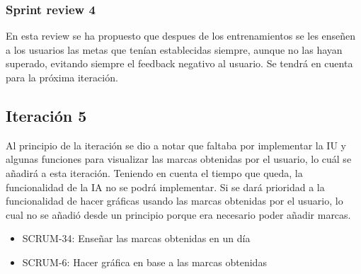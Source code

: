 \subsubsection{Sprint review 4}

En esta review se ha propuesto que despues de los entrenamientos se les enseñen a los usuarios las metas que tenían establecidas siempre, aunque no las hayan superado, evitando siempre el feedback negativo al usuario. Se tendrá en cuenta para la próxima iteración.

\subsection{Iteración 5}

Al principio de la iteración se dio a notar que faltaba por implementar la IU y algunas funciones para visualizar las marcas obtenidas por el usuario, lo cuál se añadirá a esta iteración. Teniendo en cuenta el tiempo que queda, la funcionalidad de la IA no se podrá implementar. Si se dará prioridad a la funcionalidad de hacer gráficas usando las marcas obtenidas por el usuario, lo cual no se añadió desde un principio porque era necesario poder añadir marcas.

\begin{itemize}
	\item SCRUM-34: Enseñar las marcas obtenidas en un día
	\item SCRUM-6: Hacer gráfica en base a las marcas obtenidas
\end{itemize}

\hspace{0.5cm}


